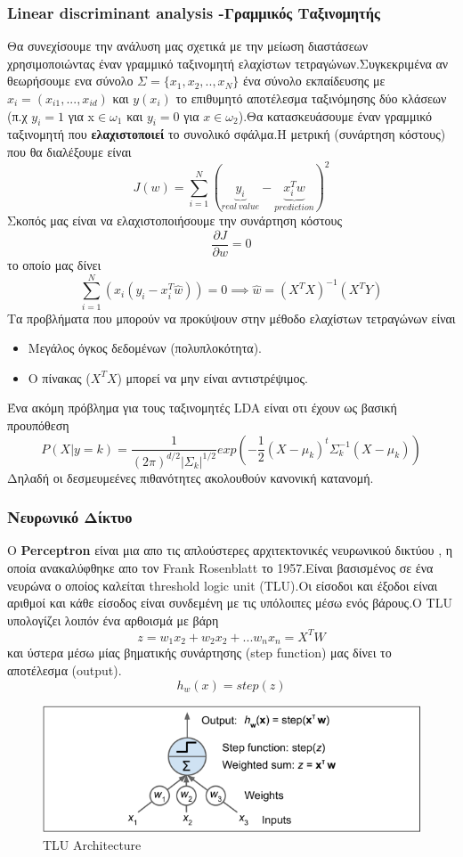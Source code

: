 \documentclass[12pt,a4paper]{article}
\begin{document}
\subsubsection{Linear discriminant analysis -Γραμμικός Ταξινομητής}
Θα συνεχίσουμε την ανάλυση μας σχετικά με την μείωση διαστάσεων χρησιμοποιώντας έναν γραμμικό ταξινομητή ελαχίστων τετραγώνων.Συγκεκριμένα αν θεωρήσουμε ενα σύνολο $\Sigma = \{x_1,x_2,..,x_N\}$ ένα σύνολο εκπαίδευσης με $x_i = (x_{i1} , ...,x_{id})$ και $y(x_i)$ το επιθυμητό αποτέλεσμα ταξινόμησης δύο κλάσεων (π.χ $ y_i=1 $ για x$\in \omega_1$ και $y_i=0$ για $x\in \omega_2$).Θα κατασκευάσουμε έναν γραμμικό ταξινομητή που \textbf{ελαχιστοποιεί} το συνολικό σφάλμα.Η μετρική (συνάρτηση κόστους) που θα διαλέξουμε είναι
$$J(w) =\sum_{i=1}^N(\underbrace{y_i}_{real \ value} - \underbrace{x_i^Tw}_{prediction})^2$$
Σκοπός μας είναι να ελαχιστοποιήσουμε την συνάρτηση κόστους
$$\frac{\partial J}{\partial w} = 0 $$
το οποίο μας δίνει
$$\sum_{i=1}^N (x_i (y_i-x_i^T\hat{w})) =0 \implies \hat{w} = (X^TX)^{-1}(X^TY)$$
Τα προβλήματα που μπορούν να προκύψουν στην μέθοδο ελαχίστων τετραγώνων είναι
\begin{itemize}
\item Μεγάλος όγκος δεδομένων (πολυπλοκότητα).
\item Ο πίνακας ($X^TX$) μπορεί να μην είναι αντιστρέψιμος.
\end{itemize}
Ένα ακόμη πρόβλημα για τους ταξινομητές LDA είναι οτι έχουν ως βασική προυπόθεση
$$P(X|y=k) =\frac{1}{(2\pi)^{d/2}|\Sigma_k|^{1/2}}exp(-\frac{1}{2}(X- \mu_k)^t \Sigma_k^{-1}(X-\mu_k))$$
Δηλαδή  οι δεσμευμεένες πιθανότητες ακολουθούν κανονική κατανομή.

\newpage

\subsubsection{Νευρωνικό Δίκτυο}
Ο \textbf{Perceptron} είναι μια απο τις απλούστερες αρχιτεκτονικές νευρωνικού δικτύου , η οποία ανακαλύφθηκε απο τον Frank Rosenblatt το 1957.Eίναι βασισμένος σε ένα νευρώνα ο οποίος καλείται threshold logic unit (TLU).Οι είσοδοι και έξοδοι είναι αριθμοί και κάθε είσοδος είναι συνδεμένη με τις υπόλοιπες μέσω ενός βάρους.O TLU υπολογίζει λοιπόν ένα αρθοισμά με βάρη
$$z = w_1x_2 + w_2x_2 + ... w_nx_n = X^TW$$
και ύστερα μέσω μίας βηματικής συνάρτησης (step function) μας δίνει το αποτέλεσμα (output).
$$h_w(x) = step(z)$$

\begin{figure}[H]
\centering
\includegraphics[width=0.60\linewidth,height=0.20\textheight]{Images/plot14}
\caption{TLU Architecture}
\label{fig:imagea}
\end{figure}
\end{document}
